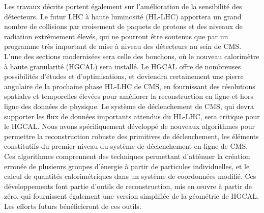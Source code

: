 {Les travaux décrits portent également sur l'amélioration de la sensibilité des détecteurs.
Le futur LHC à haute luminosité (HL-LHC) apportera un grand nombre de collisions par croisement de paquets de protons et des niveaux de radiation extrêmement élevés, qui ne pourront être soutenus que par un programme très important de mise à niveau des détecteurs au sein de CMS.
L'une des sections modernisées sera celle des bouchons, où le nouveau calorimètre à haute granularité (HGCAL) sera installé.
Le HGCAL offre de nombreuses possibilités d'études et d'optimisations, et deviendra certainement une pierre angulaire de la prochaine phase HL-LHC de CMS, en fournissant des résolutions spatiales et temporelles élevées pour améliorer la reconstruction en ligne et hors ligne des données de physique.
Le système de déclenchement de CMS, qui devra supporter les flux de données importants attendus du HL-LHC, sera critique pour le HGCAL.
Nous avons spécifiquement développé de nouveaux algorithmes pour permettre la reconstruction robuste des primitives de déclenchement, les éléments constitutifs du premier niveau du système de déclenchement en ligne de CMS.
Ces algorithmes comprennent des techniques permettant d'atténuer la création erronée de plusieurs groupes d'énergie à partir de particules individuelles, et le calcul de quantités calorimétriques dans un système de coordonnées modifié.
Ces développements font partie d'outils de reconstruction, mis en œuvre à partir de zéro, qui fournissent également une version simplifiée de la géométrie de HGCAL.
Les efforts futurs bénéficieront de ces outils.
}															%

